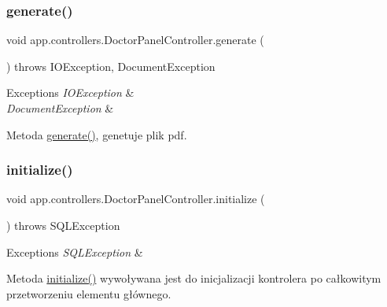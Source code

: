\subsubsection{\texorpdfstring{generate()}{generate()}}
{\footnotesize\ttfamily void app.\+controllers.\+Doctor\+Panel\+Controller.\+generate (\begin{DoxyParamCaption}{ }\end{DoxyParamCaption}) throws I\+O\+Exception, Document\+Exception}


\begin{DoxyExceptions}{Exceptions}
{\em I\+O\+Exception} & \\
\hline
{\em Document\+Exception} & \\
\hline
\end{DoxyExceptions}
Metoda \mbox{\hyperlink{classapp_1_1controllers_1_1_doctor_panel_controller_a90a301adeea72b07910035e0e188d91c}{generate()}}, genetuje plik pdf. \mbox{\label{classapp_1_1controllers_1_1_doctor_panel_controller_ad232f5938d2f2b2a12707ac6bf0db2a7}} 
\subsubsection{\texorpdfstring{initialize()}{initialize()}}
{\footnotesize\ttfamily void app.\+controllers.\+Doctor\+Panel\+Controller.\+initialize (\begin{DoxyParamCaption}{ }\end{DoxyParamCaption}) throws S\+Q\+L\+Exception}


\begin{DoxyExceptions}{Exceptions}
{\em S\+Q\+L\+Exception} & \\
\hline
\end{DoxyExceptions}
Metoda \mbox{\hyperlink{classapp_1_1controllers_1_1_doctor_panel_controller_ad232f5938d2f2b2a12707ac6bf0db2a7}{initialize()}} wywoływana jest do inicjalizacji kontrolera po całkowitym przetworzeniu elementu głównego. \mbox{\label{classapp_1_1controllers_1_1_doctor_panel_controller_a1e3355f76eb264a960f7e88694d21478}} 
